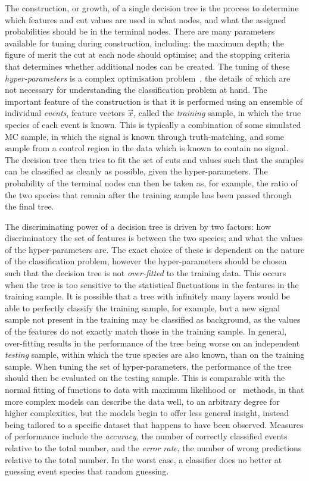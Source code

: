 The construction, or growth, of a single decision tree is the process to 
determine which features and cut values are used in what nodes, and what the 
assigned probabilities should be in the terminal nodes.
There are many parameters available for tuning during construction, including: 
the maximum depth; the figure of merit the cut at each node should optimise; 
and the stopping criteria that determines whether additional nodes can be 
created.
The tuning of these \emph{hyper-parameters} is a complex optimisation 
problem~\cite{Louppe:14077502}, the details of which are not necessary for 
understanding the classification problem at hand.
The important feature of the construction is that it is performed using an 
ensemble of individual \emph{events}, feature vectors $\vec{x}$, called the 
\emph{training} sample, in which the true species of each event is known.
This is typically a combination of some simulated \ac{MC} sample, in which the 
signal is known through truth-matching, and some sample from a control region 
in the data which is known to contain no signal.
The decision tree then tries to fit the set of cuts and values such that the 
samples can be classified as cleanly as possible, given the hyper-parameters.
The probability of the terminal nodes can then be taken as, for example, the 
ratio of the two species that remain after the training sample has been passed 
through the final tree.

The discriminating power of a decision tree is driven by two factors: how 
discriminatory the set of features is between the two species; and what the 
values of the hyper-parameters are.
The exact choice of these is dependent on the nature of the classification 
problem, however the hyper-parameters should be chosen such that the decision 
tree is not \emph{over-fitted} to the training data.
This occurs when the tree is too sensitive to the statistical fluctuations in 
the features in the training sample.
It is possible that a tree with infinitely many layers would be able to 
perfectly classify the training sample, for example, but a new signal sample 
not present in the training may be classified as background, as the values of 
the features do not exactly match those in the training sample.
In general, over-fitting results in the performance of the tree being worse on 
an independent \emph{testing} sample, within which the true species are also 
known, than on the training sample.
When tuning the set of hyper-parameters, the performance of the tree should 
then be evaluated on the testing sample.
This is comparable with the normal fitting of functions to data with maximum 
likelihood or \chisq\ methods, in that more complex models can describe the 
data well, to an arbitrary degree for higher complexities, but the models begin 
to offer less general insight, instead being tailored to a specific dataset 
that happens to have been observed.
Measures of performance include the \emph{accuracy}, the number of correctly 
classified events relative to the total number, and the \emph{error rate}, the 
number of wrong predictions relative to the total number.
In the worst case, a classifier does no better at guessing event species that 
random guessing.

